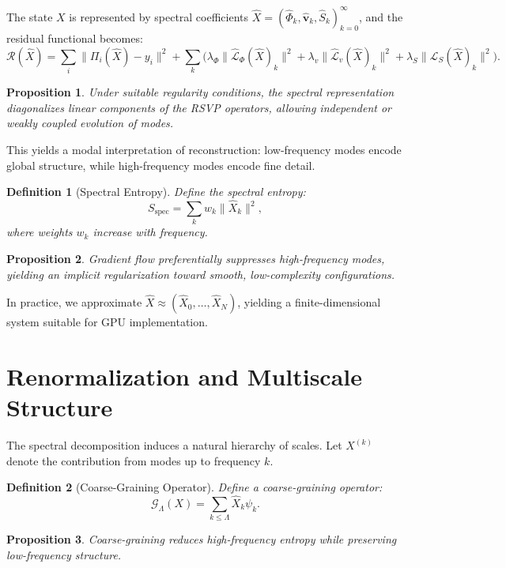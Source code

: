 \documentclass[12pt]{article}
\newtheorem{definition}{Definition}
\newtheorem{proposition}{Proposition}
\begin{document}
The state $X$ is represented by spectral coefficients $\hat{X} = (\hat{\Phi}_k, \hat{\mathbf{v}}_k, \hat{S}_k)_{k=0}^\infty$, and the residual functional becomes:
\[
\mathcal{R}(\hat{X}) = \sum_i \|\Pi_i(\hat{X}) - y_i\|^2 + \sum_k \Big( \lambda_\Phi \|\hat{\mathcal{L}}_\Phi(\hat{X})_k\|^2 + \lambda_v \|\hat{\mathcal{L}}_v(\hat{X})_k\|^2 + \lambda_S \|\hat{\mathcal{L}}_S(\hat{X})_k\|^2 \Big).
\]

\begin{proposition}
Under suitable regularity conditions, the spectral representation diagonalizes linear components of the RSVP operators, allowing independent or weakly coupled evolution of modes.
\end{proposition}

This yields a modal interpretation of reconstruction: low-frequency modes encode global structure, while high-frequency modes encode fine detail.

\begin{definition}[Spectral Entropy]
Define the spectral entropy:
\[
S_{\mathrm{spec}} = \sum_k w_k \|\hat{X}_k\|^2,
\]
where weights $w_k$ increase with frequency.
\end{definition}

\begin{proposition}
Gradient flow preferentially suppresses high-frequency modes, yielding an implicit regularization toward smooth, low-complexity configurations.
\end{proposition}

In practice, we approximate $\hat{X} \approx (\hat{X}_0, \dots, \hat{X}_N)$, yielding a finite-dimensional system suitable for GPU implementation.

\section{Renormalization and Multiscale Structure}

The spectral decomposition induces a natural hierarchy of scales. Let $X^{(k)}$ denote the contribution from modes up to frequency $k$.

\begin{definition}[Coarse-Graining Operator]
Define a coarse-graining operator:
\[
\mathcal{G}_\Lambda(X) = \sum_{k \leq \Lambda} \hat{X}_k \psi_k.
\]
\end{definition}

\begin{proposition}
Coarse-graining reduces high-frequency entropy while preserving low-frequency structure.
\end{proposition}
\end{document}
